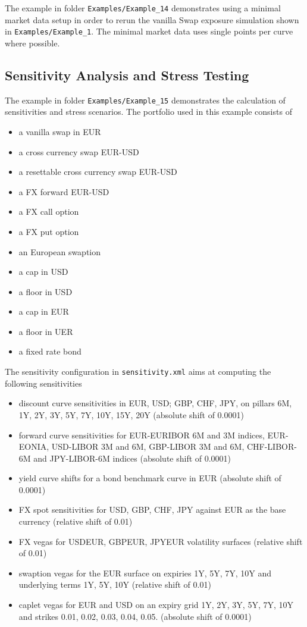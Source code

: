 \documentclass[12pt, a4paper]{article}
\begin{document}
The example in folder {\tt Examples/Example\_14} demonstrates using a minimal market data setup in order to rerun the vanilla Swap exposure simulation shown in {\tt Examples/Example\_1}. The minimal market data uses single points per curve where possible.

\subsection{Sensitivity Analysis and Stress Testing}\label{ex:sensitivity_stress}

The example in folder {\tt Examples/Example\_15} demonstrates the calculation of sensitivities and stress scenarios. The
portfolio used in this example consists of

\begin{itemize}
\item a vanilla swap in EUR
\item a cross currency swap EUR-USD
\item a resettable cross currency swap EUR-USD
\item a FX forward EUR-USD
\item a FX call option
\item a FX put option
\item an European swaption
\item a cap in USD
\item a floor in USD
\item a cap in EUR
\item a floor in UER
\item a fixed rate bond
\end{itemize}

The sensitivity configuration in {\tt sensitivity.xml} aims at computing the following sensitivities

\begin{itemize}
\item discount curve sensitivities in EUR, USD; GBP, CHF, JPY, on pillars 6M, 1Y, 2Y, 3Y, 5Y, 7Y, 10Y, 15Y, 20Y (absolute shift of 0.0001)
\item forward curve sensitivities for EUR-EURIBOR 6M and 3M indices, EUR-EONIA, USD-LIBOR 3M and 6M, GBP-LIBOR 3M and
  6M, CHF-LIBOR-6M and JPY-LIBOR-6M indices (absolute shift of 0.0001)
\item yield curve shifts for a bond benchmark curve in EUR (absolute shift of 0.0001)
\item FX spot sensitivities for USD, GBP, CHF, JPY against EUR as the base currency (relative shift of 0.01)
\item FX vegas for USDEUR, GBPEUR, JPYEUR volatility surfaces (relative shift of 0.01)
\item swaption vegas for the EUR surface on expiries 1Y, 5Y, 7Y, 10Y and underlying terms 1Y, 5Y, 10Y (relative shift of 0.01)
\item caplet vegas for EUR and USD on an expiry grid 1Y, 2Y, 3Y, 5Y, 7Y, 10Y and strikes 0.01, 0.02, 0.03, 0.04,
  0.05. (absolute shift of 0.0001)
\end{itemize}
\end{document}
